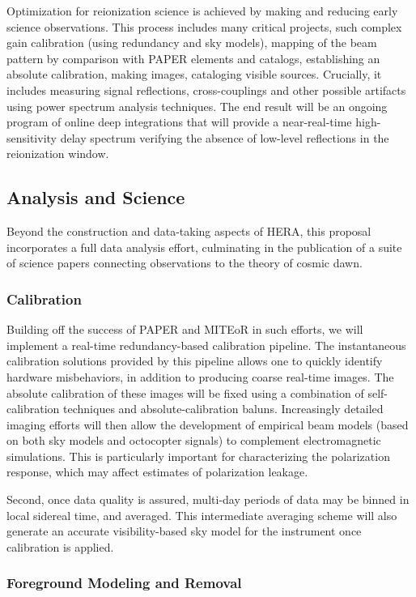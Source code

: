 \documentclass[preprint]{aastex}
\begin{document}
Optimization for reionization science is achieved by making and reducing early science observations. This process includes many critical projects, such complex gain calibration (using redundancy and sky models), mapping of the beam pattern by comparison with PAPER elements and catalogs, establishing an absolute calibration, making images, cataloging visible sources. Crucially, it includes measuring signal reflections, cross-couplings and other possible artifacts using power spectrum analysis techniques. The end result will be an ongoing program of online deep integrations that will provide a near-real-time high-sensitivity delay spectrum verifying the absence of low-level reflections in the reionization window.


\subsection{Analysis and Science}

Beyond the construction and data-taking aspects of HERA, this proposal incorporates a full data analysis effort, culminating in the publication of a suite of science papers connecting observations to the theory of cosmic dawn.

\subsubsection{Calibration}

Building off the success of PAPER and MITEoR in such efforts, we will implement a real-time redundancy-based calibration pipeline.  The instantaneous calibration solutions provided by this pipeline allows one to quickly identify hardware misbehaviors, in addition to producing coarse real-time images.  The absolute calibration of these images will be fixed using a combination of self-calibration techniques and absolute-calibration baluns.  Increasingly detailed imaging efforts will then allow the development of empirical beam models (based on both sky models and octocopter signals) to complement electromagnetic simulations.  This is particularly important for characterizing the polarization response, which may affect estimates of polarization leakage.

Second, once data quality is assured, multi-day periods of data may be
binned in local sidereal time, and averaged. This intermediate
averaging scheme will also generate an accurate visibility-based sky
model for the instrument once calibration is applied.

\subsubsection{Foreground Modeling and Removal}
\label{sec:DataProducts}
\end{document}
